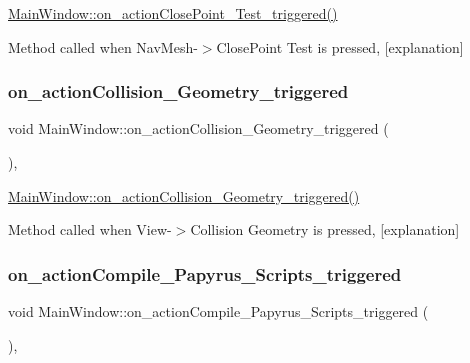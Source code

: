 \hyperlink{class_main_window_a5f7a6767c44f88599408d3494ff7239d}{Main\+Window\+::on\+\_\+action\+Close\+Point\+\_\+\+Test\+\_\+triggered()} 

Method called when Nav\+Mesh-\/$>$Close\+Point Test is pressed, \mbox{[}explanation\mbox{]} \mbox{\label{class_main_window_a26f1dd43b9b49ddc65d8e6a0ab7f2b6b}} 
\subsubsection{\texorpdfstring{on\+\_\+action\+Collision\+\_\+\+Geometry\+\_\+triggered}{on\_actionCollision\_Geometry\_triggered}}
{\footnotesize\ttfamily void Main\+Window\+::on\+\_\+action\+Collision\+\_\+\+Geometry\+\_\+triggered (\begin{DoxyParamCaption}{ }\end{DoxyParamCaption})\hspace{0.3cm}{\ttfamily [private]}, {\ttfamily [slot]}}



\hyperlink{class_main_window_a26f1dd43b9b49ddc65d8e6a0ab7f2b6b}{Main\+Window\+::on\+\_\+action\+Collision\+\_\+\+Geometry\+\_\+triggered()} 

Method called when View-\/$>$Collision Geometry is pressed, \mbox{[}explanation\mbox{]} \mbox{\label{class_main_window_aa087e7b86de7eb48d08a7bd160fd70be}} 
\subsubsection{\texorpdfstring{on\+\_\+action\+Compile\+\_\+\+Papyrus\+\_\+\+Scripts\+\_\+triggered}{on\_actionCompile\_Papyrus\_Scripts\_triggered}}
{\footnotesize\ttfamily void Main\+Window\+::on\+\_\+action\+Compile\+\_\+\+Papyrus\+\_\+\+Scripts\+\_\+triggered (\begin{DoxyParamCaption}{ }\end{DoxyParamCaption})\hspace{0.3cm}{\ttfamily [private]}, {\ttfamily [slot]}}



